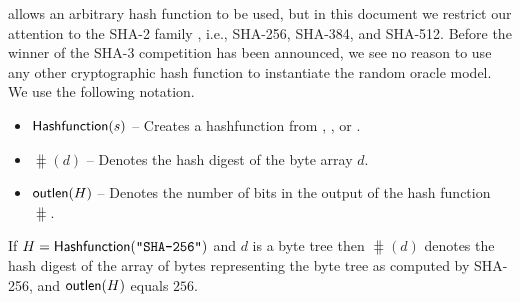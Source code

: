 \documentclass[11pt]{article}
\begin{document}
\veri allows an arbitrary hash function to be used, but in this
document we restrict our attention to the SHA-2 family \cite{sha},
i.e., SHA-256, SHA-384, and SHA-512. Before the winner of the SHA-3
competition has been announced, we see no reason to use any other
cryptographic hash function to instantiate the random oracle model. We
use the following notation.
\begin{itemize}



\item$\textsf{Hashfunction}(s)$ -- Creates a hashfunction from
  , , or .

\item$\hash(d)$ -- Denotes the hash digest of the byte array $d$.

\item$\textsf{outlen}(H)$ -- Denotes the number of bits in the output of
  the hash function $\hash$.

\end{itemize}


\begin{example}
  If $H=\textsf{Hashfunction}(\texttt{"SHA-256"})$ and $d$ is a byte tree
  then $\hash(d)$ denotes the hash digest of the array of bytes
  representing the byte tree as computed by SHA-256, and
  $\textsf{outlen}(H)$ equals $256$.
\end{example}
\end{document}
